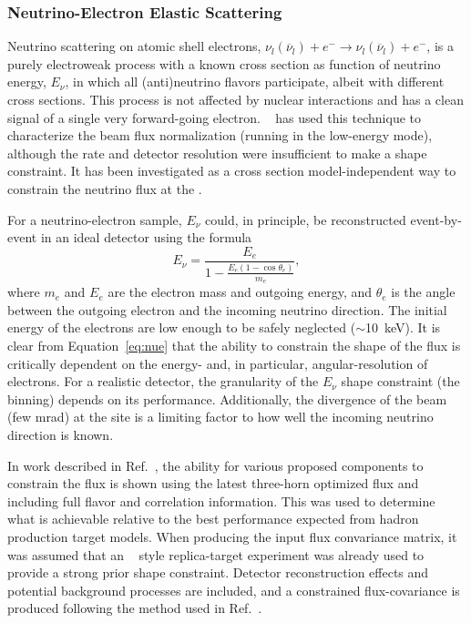 \subsubsection{Neutrino-Electron Elastic Scattering}
\label{sec:appx-nd:lartpc-nu-electron-scatt}

Neutrino scattering on atomic shell electrons, $\nu_{l}(\overline{\nu}_{l}) + e^{-} \rightarrow \nu_{l}(\overline{\nu}_{l}) + e^{-}$,
is a purely electroweak process with a known cross section as function of neutrino energy, $E_{\nu}$, in which all (anti)neutrino flavors participate, albeit with different cross sections. This process is not affected by nuclear interactions and has a clean signal of a single very forward-going electron. ~\cite{Park:2015eqa} has used this technique to characterize the  beam flux normalization (running in the  low-energy mode), although the rate and detector resolution were insufficient to make a shape constraint. It has been investigated as a cross section model-independent way to constrain the neutrino flux at the   .

For a neutrino-electron  sample, $E_{\nu}$ could, in principle, be reconstructed event-by-event in an ideal detector using the formula
\begin{equation}
  E_{\nu} = \frac{E_{e}}{1 - \frac{E_{e}(1-\cos\theta_{e})}{m_{e}}},
\label{eq:nue}
\end{equation}
\noindent where $m_e$ and $E_e$ are the electron mass and outgoing energy, and $\theta_e$ is the angle between the outgoing electron and the incoming neutrino direction. The initial energy of the electrons are low enough to be safely neglected ($\sim$\SI{10}{keV}). It is clear from Equation~\ref{eq:nue} that the ability to constrain the shape of the flux is critically dependent on the energy- and, in particular, angular-resolution of electrons. For a realistic detector, the granularity of the $E_{\nu}$ shape constraint (the binning) depends on its performance. Additionally, the divergence of the beam (few \si{mrad}) at the    site is a limiting factor to how well the incoming neutrino direction is known.

In work described in Ref.~\cite{dune_nue}, the ability for various proposed   components to constrain the  flux is shown using the latest three-horn optimized flux and including full flavor and correlation information.  This was used to determine what is achievable relative to the best performance expected from hadron production target models. When producing the input flux convariance matrix, it was assumed that an ~\cite{Laszlo:2009vg} style replica-target experiment was already used to provide a strong prior shape constraint. Detector reconstruction effects and potential background processes are included, and a constrained flux-covariance is produced following the method used in Ref.~\cite{Park:2015eqa}.

